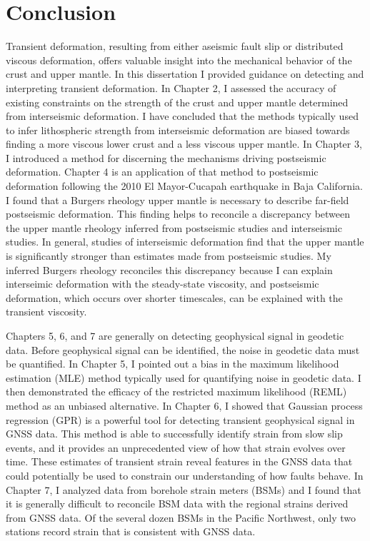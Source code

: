\chapter{Conclusion}
Transient deformation, resulting from either aseismic fault slip or
distributed viscous deformation, offers valuable insight into the
mechanical behavior of the crust and upper mantle. In this
dissertation I provided guidance on detecting and interpreting
transient deformation. In Chapter 2, I assessed the accuracy of
existing constraints on the strength of the crust and upper mantle
determined from interseismic deformation. I have concluded that the
methods typically used to infer lithospheric strength from
interseismic deformation are biased towards finding a more viscous
lower crust and a less viscous upper mantle. In Chapter 3, I
introduced a method for discerning the mechanisms driving postseismic
deformation. Chapter 4 is an application of that method to postseismic
deformation following the 2010 El Mayor-Cucapah earthquake in Baja
California. I found that a Burgers rheology upper mantle is necessary
to describe far-field postseismic deformation. This finding helps to
reconcile a discrepancy between the upper mantle rheology inferred
from postseismic studies and interseismic studies. In general, studies
of interseismic deformation find that the upper mantle is
significantly stronger than estimates made from postseismic studies.
My inferred Burgers rheology reconciles this discrepancy because I can
explain interseimic deformation with the steady-state viscosity, and
postseismic deformation, which occurs over shorter timescales, can be
explained with the transient viscosity.

Chapters 5, 6, and 7 are generally on detecting geophysical signal in
geodetic data. Before geophysical signal can be identified, the noise
in geodetic data must be quantified. In Chapter 5, I pointed out a
bias in the maximum likelihood estimation (MLE) method typically used
for quantifying noise in geodetic data. I then demonstrated the
efficacy of the restricted maximum likelihood (REML) method as an
unbiased alternative. In Chapter 6, I showed that Gaussian process
regression (GPR) is a powerful tool for detecting transient
geophysical signal in GNSS data. This method is able to successfully
identify strain from slow slip events, and it provides an
unprecedented view of how that strain evolves over time. These
estimates of transient strain reveal features in the GNSS data that
could potentially be used to constrain our understanding of how faults
behave. In Chapter 7, I analyzed data from borehole strain meters
(BSMs) and I found that it is generally difficult to reconcile BSM
data with the regional strains derived from GNSS data. Of the several
dozen BSMs in the Pacific Northwest, only two stations record strain
that is consistent with GNSS data.

